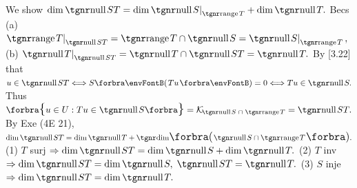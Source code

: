 
We show $\dim \null ST=\dim \null S\mmid_{\range T} + \dim \null T.$\parSol{}
Becs (a) \uline{$\range T\mmid_{\null ST}=\range T\cap\null S=\null S\mmid_{\range T}\,,$}\parSol{}
 (b) \uline{$\null T\mmid_{\null ST}=\null T\cap\null ST=\null T.$} By [3.22]\PfEnd\parSol{\vspace{3pt}}
\Or \NOTICE that \uline{$u\in\null ST\Longleftrightarrow S\Par{Tu}=0\Longleftrightarrow Tu\in\null S.$}\parSol{}
\Blind{\Or}Thus \uline{$\Bra{u\in U:Tu\in\null S}=\mathcal{K}_{\!\null S\;\cap\;\range T}=\null ST.$}\parSol{}
\Blind{\Or}By Exe (4E 21), $\dim\null ST=\dim\null T+\Dim\BigPar{\null S\cap\range T}.$\PfEnd\vspace{2pt}
\ACoro (1) $T$ surj $\Rightarrow\dim\null ST=\dim\null S+\dim\null T.$\parCor
(2) $T$ inv $\Rightarrow\dim\null ST=\dim\null S,\;\null ST=\null T.$\parCor
(3) $S$ inje $\Rightarrow\dim\null ST=\dim\null T.$\vspace{-3pt}
\SepLine\pagebreak

